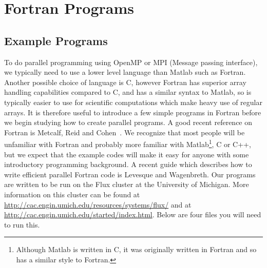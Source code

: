 \chapter{Fortran Programs}

\section{Example Programs}

To do parallel programming using OpenMP or MPI (Message passing interface), we typically need to use a lower level language than Matlab such as Fortran. Another possible choice of language is C, however Fortran has superior array handling capabilities compared to C, and has a similar syntax to Matlab, so is typically easier to use for scientific computations which make heavy use of regular arrays. It is therefore useful to introduce a few simple programs in Fortran before we begin studying how to create parallel programs. A good recent reference on Fortran is Metcalf, Reid and Cohen~\cite{MetReiCoh11}.  We recognize that most people will be unfamiliar with Fortran and probably more familiar with Matlab\footnote{Although Matlab is written in C, it was originally written in Fortran and so has a similar style to Fortran.}, C or C++, but we expect that the example codes will make it easy for anyone with some introductory programming background.   A recent guide which describes how to write efficient parallel Fortran code is Levesque and Wagenbreth\cite{LevWag11}. Our programs are written to be run on the Flux cluster at the University of Michigan. More information on this cluster can be found at \url{http://cac.engin.umich.edu/resources/systems/flux/} and at \url{http://cac.engin.umich.edu/started/index.html}. Below are four files you will need to run this.

